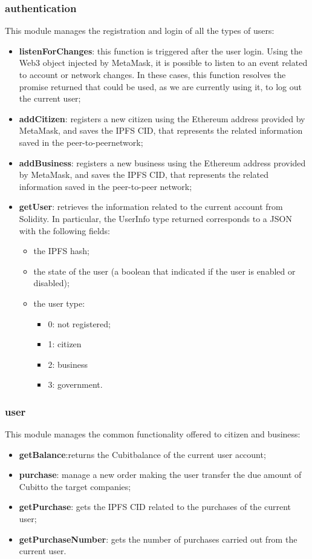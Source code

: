 \subsubsection{authentication\glo}
This module manages the registration and login of all the types of users:
\begin{itemize}
	\item \textbf{listenForChanges}: this function is triggered after the user login. Using the Web3 object injected by MetaMask\glo, it is possible to listen to an event related to account or network changes. In these cases, this function resolves the promise returned that could be used, as we are currently using it, to log out the current user;
	\item \textbf{addCitizen}: registers a new citizen using the Ethereum address provided by MetaMask, and saves the IPFS CID, that represents the related information saved in the peer-to-peer\glosp network;
	\item \textbf{addBusiness}: registers a new business using the Ethereum address provided by MetaMask, and saves the IPFS CID, that represents the related information saved in the peer-to-peer network;
	\item \textbf{getUser}: retrieves the information related to the current account from Solidity. In particular, the UserInfo type returned corresponds to a JSON with the following fields:
	\begin{itemize}
		\item the IPFS hash;
		\item the state of the user (a boolean that indicated if the user is enabled or disabled);
		\item the user type:
		\begin{itemize}
			\item 0: not registered;
			\item 1: citizen
			\item 2: business
			\item 3: government.
		\end{itemize}
	\end{itemize}
\end{itemize}
\subsubsection{user}
This module manages the common functionality offered to citizen and business:
\begin{itemize}
	\item \textbf{getBalance}:returns the Cubit\glosp balance of the current user account;
	\item \textbf{purchase}: manage a new order making the user transfer the due amount of Cubit\glosp to the target companies;
	\item \textbf{getPurchase}: gets the IPFS CID related to the purchases of the current user;
	\item \textbf{getPurchaseNumber}: gets the number of purchases carried out from the current user.
\end{itemize}
